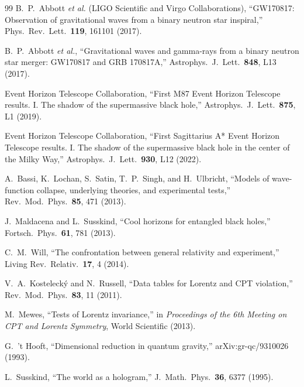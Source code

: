 \documentclass[aps,prd,twocolumn,showpacs,superscriptaddress,preprintnumbers]{revtex4-2}
\begin{document}
\begin{thebibliography}{99}
B.~P.~Abbott \textit{et al.} (LIGO Scientific and Virgo Collaborations),
``GW170817: Observation of gravitational waves from a binary neutron star inspiral,''
Phys.\ Rev.\ Lett.\ \textbf{119}, 161101 (2017).

B.~P.~Abbott \textit{et al.},
``Gravitational waves and gamma-rays from a binary neutron star merger: GW170817 and GRB 170817A,''
Astrophys.\ J.\ Lett.\ \textbf{848}, L13 (2017).

Event Horizon Telescope Collaboration,
``First M87 Event Horizon Telescope results. I. The shadow of the supermassive black hole,''
Astrophys.\ J.\ Lett.\ \textbf{875}, L1 (2019).

Event Horizon Telescope Collaboration,
``First Sagittarius A* Event Horizon Telescope results. I. The shadow of the supermassive black hole in the center of the Milky Way,''
Astrophys.\ J.\ Lett.\ \textbf{930}, L12 (2022).

A.~Bassi, K.~Lochan, S.~Satin, T.~P.~Singh, and H.~Ulbricht,
``Models of wave-function collapse, underlying theories, and experimental tests,''
Rev.\ Mod.\ Phys.\ \textbf{85}, 471 (2013).

J.~Maldacena and L.~Susskind,
``Cool horizons for entangled black holes,''
Fortsch.\ Phys.\ \textbf{61}, 781 (2013).

C.~M.~Will,
``The confrontation between general relativity and experiment,''
Living Rev.\ Relativ.\ \textbf{17}, 4 (2014).

V.~A.~Kosteleck{\'y} and N.~Russell,
``Data tables for Lorentz and CPT violation,''
Rev.\ Mod.\ Phys.\ \textbf{83}, 11 (2011).

M.~Mewes,
``Tests of Lorentz invariance,''
in \textit{Proceedings of the 6th Meeting on CPT and Lorentz Symmetry},
World Scientific (2013).

G.~'t Hooft,
``Dimensional reduction in quantum gravity,''
arXiv:gr-qc/9310026 (1993).

L.~Susskind,
``The world as a hologram,''
J.\ Math.\ Phys.\ \textbf{36}, 6377 (1995).

\end{thebibliography}
\end{document}
